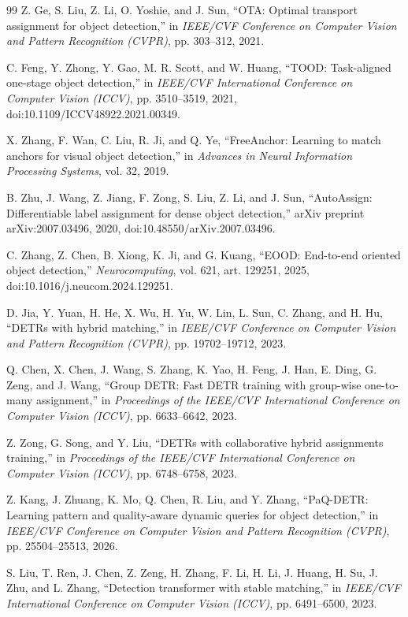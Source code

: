 \begin{thebibliography}{99}
Z. Ge, S. Liu, Z. Li, O. Yoshie, and J. Sun,
``OTA: Optimal transport assignment for object detection,''
in \emph{IEEE/CVF Conference on Computer Vision and Pattern Recognition (CVPR)},
pp. 303--312, 2021.

C. Feng, Y. Zhong, Y. Gao, M. R. Scott, and W. Huang,
``TOOD: Task-aligned one-stage object detection,''
in \emph{IEEE/CVF International Conference on Computer Vision (ICCV)}, pp. 3510--3519, 2021,
doi:10.1109/ICCV48922.2021.00349.

X. Zhang, F. Wan, C. Liu, R. Ji, and Q. Ye,
``FreeAnchor: Learning to match anchors for visual object detection,''
in \emph{Advances in Neural Information Processing Systems}, vol. 32, 2019.

B. Zhu, J. Wang, Z. Jiang, F. Zong, S. Liu, Z. Li, and J. Sun,
``AutoAssign: Differentiable label assignment for dense object detection,''
arXiv preprint arXiv:2007.03496, 2020,
doi:10.48550/arXiv.2007.03496.

C. Zhang, Z. Chen, B. Xiong, K. Ji, and G. Kuang,
``EOOD: End-to-end oriented object detection,''
\emph{Neurocomputing}, vol. 621, art. 129251, 2025,
doi:10.1016/j.neucom.2024.129251.

D. Jia, Y. Yuan, H. He, X. Wu, H. Yu, W. Lin, L. Sun, C. Zhang, and H. Hu,
``DETRs with hybrid matching,''
in \emph{IEEE/CVF Conference on Computer Vision and Pattern Recognition (CVPR)},
pp. 19702--19712, 2023.

Q. Chen, X. Chen, J. Wang, S. Zhang, K. Yao, H. Feng, J. Han, E. Ding,
G. Zeng, and J. Wang,
``Group DETR: Fast DETR training with group-wise one-to-many assignment,''
in \emph{Proceedings of the IEEE/CVF International Conference on Computer Vision (ICCV)},
pp. 6633--6642, 2023.

Z. Zong, G. Song, and Y. Liu,
``DETRs with collaborative hybrid assignments training,''
in \emph{Proceedings of the IEEE/CVF International Conference on Computer Vision (ICCV)},
pp. 6748--6758, 2023.

Z. Kang, J. Zhuang, K. Mo, Q. Chen, R. Liu, and Y. Zhang,
``PaQ-DETR: Learning pattern and quality-aware dynamic queries for object detection,''
in \emph{IEEE/CVF Conference on Computer Vision and Pattern Recognition (CVPR)},
pp. 25504--25513, 2026.

S. Liu, T. Ren, J. Chen, Z. Zeng, H. Zhang, F. Li, H. Li, J. Huang,
H. Su, J. Zhu, and L. Zhang,
``Detection transformer with stable matching,''
in \emph{IEEE/CVF International Conference on Computer Vision (ICCV)},
pp. 6491--6500, 2023.


\end{thebibliography}
